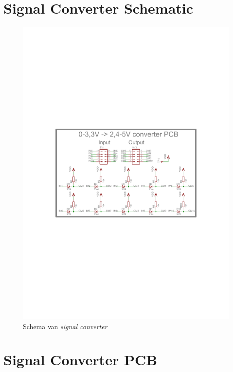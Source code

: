 \chapter{Signal Converter Schematic}
\label{app:sig-conv-schematic}

\begin{figure}
    \includegraphics[scale=.75]{appendix/SignaalConverter_schematic.pdf}
    \caption{Schema van \emph{signal converter}}
\end{figure}

\chapter{Signal Converter PCB}
\label{app:sig-conv-pcb}

